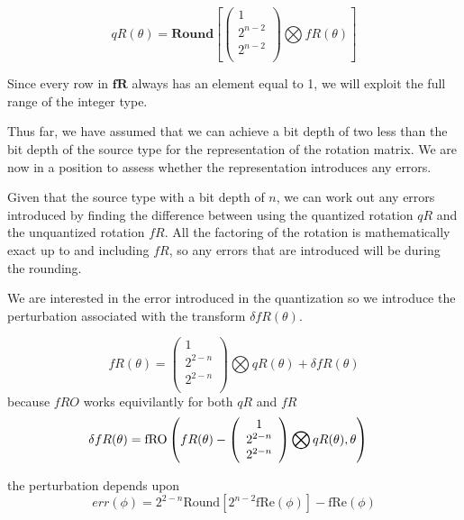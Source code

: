 \begin{equation}
 qR(\theta) =
\textbf{Round}[
\left(
\begin{array}{c}
 1  \\
 2^{n - 2} \\
 2^{n - 2}  \\
\end{array}
\right)
\bigotimes
fR(\theta)]
\end{equation}

Since every row in $\mathbf{fR}$ always has an element equal to 1, we will exploit the full range of the integer type. 

Thus far, we have assumed that we can achieve a bit depth of two less than the bit depth of the source type for the representation of the rotation matrix. We are now in a position to assess whether the representation introduces any errors.

Given that the source type with a bit depth of $n$, we can work out any errors introduced by finding the difference between using the quantized rotation $qR$ and the unquantized rotation $fR$. All the factoring of the rotation is mathematically exact up to and including $fR$, so any errors that are introduced will be during the rounding.

We are interested in the error introduced in the quantization so we introduce the perturbation associated with the transform $\delta fR(\theta)$. 



\begin{equation}
 fR(\theta) =
\left(
\begin{array}{c}
 1  \\
 2^{2-n } \\
 2^{2-n }  \\
\end{array}
\right)
\bigotimes
qR(\theta) + \delta fR(\theta)
\end{equation}
because $fRO$ works equivilantly for both $qR$ and $fR$
\begin{align}
\delta fR(\theta) &= \text{fRO}\left(   fR(\theta) -\left(
\begin{array}{c}
 1  \\
 2^{2-n } \\
 2^{2-n }  \\
\end{array}
\right)
\bigotimes
qR(\theta)  ,\theta\right) 
\end{align}

the perturbation depends upon
\begin{equation}
err(\phi)=2^{2-n} \text{Round}\left[2^{n-2} \text{fRe}(\phi )\right]-\text{fRe}(\phi ) 
\end{equation}

